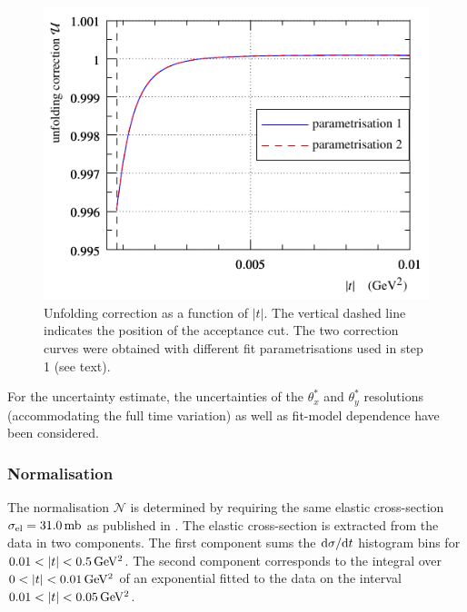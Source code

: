 \begin{figure}
\begin{center}
\includegraphics{fig/unfolding_num_int_model_cmp.pdf}
\caption{%
Unfolding correction as a function of $|t|$. The vertical dashed line indicates the position of the acceptance cut. The two correction curves were obtained with different fit parametrisations used in step 1 (see text).
}
\label{fig:unfolding}
\end{center}
\end{figure}

For the uncertainty estimate, the uncertainties of the $\theta_x^*$ and $\theta_y^*$ resolutions (accommodating the full time variation) as well as fit-model dependence have been considered.




\subsubsection{Normalisation}
\label{sec:normalisation}

The normalisation $\mathcal{N}$ is determined by requiring the same elastic cross-section $\sigma_{\rm el} = 31.0\,{\rm mb}$ as published in \cite{totem-13tev-90m}. The elastic cross-section is extracted from the data in two components. The first component sums the ${\rm d}\sigma/{\rm d} t$ histogram bins for $0.01 < |t| < 0.5\,{\rm GeV^2}$. The second component corresponds to the integral over $0 < |t| < 0.01\,{\rm GeV^2}$ of an exponential fitted to the data on the interval $0.01 < |t| < 0.05\,{\rm GeV^2}$.

